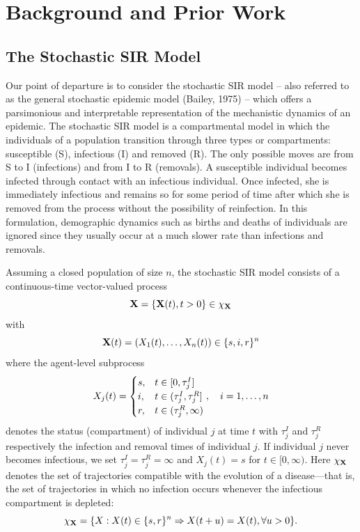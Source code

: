 \documentclass[11pt]{article}
\begin{document}
	\section{Background and Prior Work}
	\label{sec:set}
	
	\subsection{The Stochastic SIR Model}
	\label{sec:sir}
	
	Our point of departure is to consider the stochastic SIR model -- also referred to as the general stochastic epidemic model (Bailey, 1975) -- which offers a parsimonious and interpretable representation of the mechanistic dynamics of an epidemic. The stochastic SIR model is a compartmental model in which the individuals of a population transition through three types or compartments: susceptible (S), infectious (I) and removed (R). The only possible moves are from S to I (infections) and from I to R (removals). A susceptible individual becomes infected through contact with an infectious individual. Once infected, she is immediately infectious and remains so for some period of time after which she is removed from the process without the possibility of reinfection. In this formulation, demographic dynamics such as births and deaths of individuals are ignored since they usually occur at a much slower rate than infections and removals.
	
	Assuming a closed population of size $n$, the stochastic SIR model consists of a continuous-time vector-valued process
	\begin{equation}
		\label{eq:X}
		\mathbf{X} = \left\lbrace \mathbf{X}(t), t>0\right\rbrace \in \chi_{\mathbf{X}}
	\end{equation}
	with
	\begin{equation}
		\mathbf{X}(t) = (X_1(t), \dots, X_n(t)) \in \{s, i, r\}^n
	\end{equation}
	where the agent-level subprocess
	$$ X_j(t) = 
	\begin{cases}
		s, & t \in [0, \tau^I_j] \\
		i, & t \in (\tau^I_j, \tau^R_j] \\
		r, & t \in (\tau^R_j, \infty)
	\end{cases}
	,\quad i=1,\dots,n
	$$
	denotes the status (compartment) of individual $j$ at time $t$ with $\tau^I_j$ and $\tau^R_j$ respectively the infection and removal times of individual $j$. If individual $j$ never becomes infectious, we set $\tau^I_j = \tau^R_j = \infty$ and $X_j(t) = s$ for $t \in [0, \infty)$. Here $\chi_{\mathbf{X}}$ denotes the set of trajectories compatible with the evolution of a disease---that is, the set of trajectories in which no infection occurs whenever the infectious compartment is depleted:
	\begin{equation}
		\label{eq:chi}
		\chi_{\mathbf{X}} = \{X:X(t) \in \{s,r\}^n \Rightarrow X(t+u) = X(t), \forall u>0 \}.
	\end{equation}
	
\end{document}
